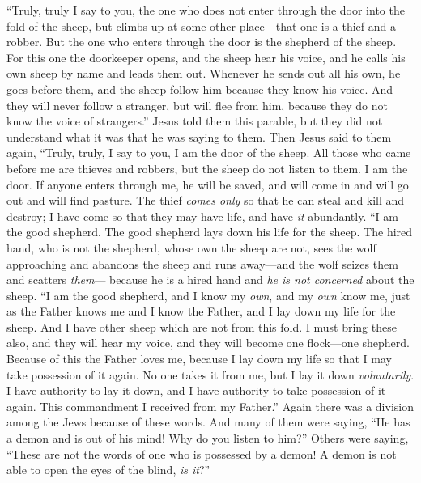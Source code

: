 \begin{biblechapter} %
 “Truly, truly I say to you, the one who does not enter through the door into the fold of the sheep, but climbs up at some other place—that one is a thief and a robber.
\verse But the one who enters through the door is the shepherd of the sheep.
\verse For this one the doorkeeper opens, and the sheep hear his voice, and he calls his own sheep by name and leads them out.
\verse Whenever he sends out all his own, he goes before them, and the sheep follow him because they know his voice.
\verse And they will never follow a stranger, but will flee from him, because they do not know the voice of strangers.”
\verse Jesus told them this parable, but they did not understand what it was that he was saying to them.
\verse Then Jesus said to them again, “Truly, truly, I say to you, I am the door of the sheep.
\verse All those who came before me are thieves and robbers, but the sheep do not listen to them.
\verse I am the door. If anyone enters through me, he will be saved, and will come in and will go out and will find pasture.
\verse The thief \textit{comes only} so that he can steal and kill and destroy; I have come so that they may have life, and have \textit{it} abundantly.
\verse “I am the good shepherd. The good shepherd lays down his life for the sheep.
\verse The hired hand, who is not the shepherd, whose own the sheep are not, sees the wolf approaching and abandons the sheep and runs away—and the wolf seizes them and scatters \textit{them}—
\verse because he is a hired hand and \textit{he is not concerned} about the sheep.
\verse “I am the good shepherd, and I know my \textit{own}, and my \textit{own} know me,
\verse just as the Father knows me and I know the Father, and I lay down my life for the sheep.
\verse And I have other sheep which are not from this fold. I must bring these also, and they will hear my voice, and they will become one flock—one shepherd.
\verse Because of this the Father loves me, because I lay down my life so that I may take possession of it again.
\verse No one takes it from me, but I lay it down \textit{voluntarily}. I have authority to lay it down, and I have authority to take possession of it again. This commandment I received from my Father.”
\verse Again there was a division among the Jews because of these words.
\verse And many of them were saying, “He has a demon and is out of his mind! Why do you listen to him?”
\verse Others were saying, “These are not the words of one who is possessed by a demon! A demon is not able to open the eyes of the blind, \textit{is it}?”

\end{biblechapter}
